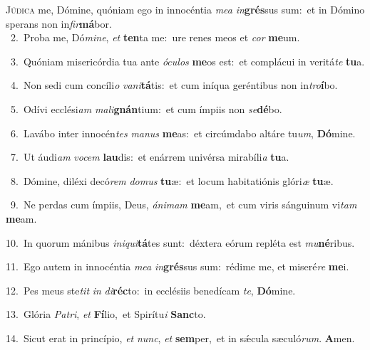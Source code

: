 \lettrine{\initial\textcolor{\initialcolor}{J}}{údica} me, Dómine, quóniam ego in innocéntia \textit{me}\-\textit{a} \textit{in}\-\textbf{grés}sus sum:~\star et in Dómino sperans non in\-\textit{fir}\-\textbf{má}bor.\\
{\numbfont\textcolor{\numbcolor}{~2.}}~Proba me, Dó\-\textit{mi}\-\textit{ne}, \textit{et} \textbf{ten}\-ta me:~\star ure renes meos et \textit{cor} \textbf{me}\-um.\par
{\numbfont\textcolor{\numbcolor}{~3.}}~Quóniam misericórdia tua ante \textit{ó}\-\textit{cu}\textit{los} \textbf{me}\-os est:~\star et complácui in veritá\textit{te} \textbf{tu}\-a.\par
{\numbfont\textcolor{\numbcolor}{~4.}}~Non sedi cum concíli\textit{o} \textit{va}\-\textit{ni}\textbf{tá}tis:~\star et cum iníqua geréntibus non in\-\textit{tro}\-\textbf{í}bo.\par
{\numbfont\textcolor{\numbcolor}{~5.}}~Odívi ecclési\textit{am} \textit{ma}\-\textit{li}\textbf{gnán}tium:~\star et cum ímpiis non \textit{se}\-\textbf{dé}bo.\par
{\numbfont\textcolor{\numbcolor}{~6.}}~Lavábo inter innocén\textit{tes} \textit{ma}\-\textit{nus} \textbf{me}\-as:~\star et circúmdabo altáre tu\-\textit{um}\-, \textbf{Dó}\-mine.\par
{\numbfont\textcolor{\numbcolor}{~7.}}~Ut áudi\textit{am} \textit{vo}\-\textit{cem} \textbf{lau}\-dis:~\star et enárrem univérsa mirabíli\textit{a} \textbf{tu}\-a.\par
{\numbfont\textcolor{\numbcolor}{~8.}}~Dómine, diléxi decó\textit{rem} \textit{do}\-\textit{mus} \textbf{tu}\-æ:~\star et locum habitatiónis glóri\textit{æ} \textbf{tu}\-æ.\par
{\numbfont\textcolor{\numbcolor}{~9.}}~Ne perdas cum ímpiis, Deus, \textit{á}\-\textit{ni}\textit{mam} \textbf{me}\-am,~\star et cum viris sánguinum vi\textit{tam} \textbf{me}\-am.\par
{\numbfont\textcolor{\numbcolor}{10.}}~In quorum mánibus \textit{in}\-\textit{i}\textit{qui}\textbf{tá}tes sunt:~\star déxtera eórum repléta est \textit{mu}\-\textbf{né}ribus.\par
{\numbfont\textcolor{\numbcolor}{11.}}~Ego autem in innocéntia \textit{me}\-\textit{a} \textit{in}\-\textbf{grés}sus sum:~\star rédime me, et miseré\textit{re} \textbf{me}\-i.\par
{\numbfont\textcolor{\numbcolor}{12.}}~Pes meus ste\textit{tit} \textit{in} \textit{di}\-\textbf{réc}to:~\star in ecclésiis benedícam \textit{te}\-, \textbf{Dó}\-mine.\par
{\numbfont\textcolor{\numbcolor}{13.}}~Glória \textit{Pa}\-\textit{tri}, \textit{et} \textbf{Fí}\-lio,~\star et Spirítu\textit{i} \textbf{Sanc}\-to.\par
{\numbfont\textcolor{\numbcolor}{14.}}~Sicut erat in princípio, \textit{et} \textit{nunc}\-, \textit{et} \textbf{sem}\-per,~\star et in sǽcula sæculó\-\textit{rum}\-. \textbf{A}\-men.\par
